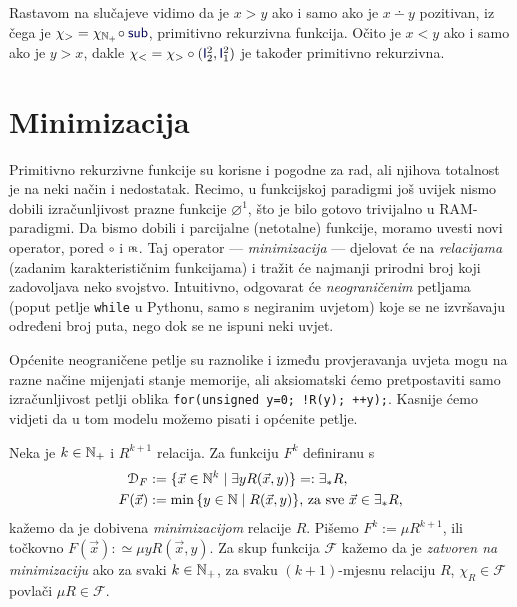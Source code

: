 \begin{primjer}[{name=[primitivna rekurzivnost relacija strogog uređaja]}]\label{pr:m-v}
Rastavom na slučajeve vidimo da je $x>y$ ako i samo ako je $x\dotminus y$ pozitivan, iz čega je $\chi_>=\chi_{\N_+}\!\circ\f{sub}$, pri\-mi\-tiv\-no rekurzivna funkcija. Očito je $x<y$ ako i samo ako je $y>x$, dakle $\chi_<=\chi_>\circ(\f I_2^2,\f I_1^2)$ je također primitivno rekurzivna.
\end{primjer}

\section{Minimizacija}

Primitivno rekurzivne funkcije su korisne i pogodne za rad, ali njihova totalnost je na neki način i nedostatak. Recimo, u funkcijskoj paradigmi još uvijek nismo dobili izračunljivost prazne funkcije $\varnothing^1$, što je bilo gotovo trivijalno u RAM-paradigmi. Da bismo dobili i parcijalne (netotalne) funkcije, moramo uvesti novi operator, pored $\circ$ i $\pr$. Taj operator --- \emph{minimizacija} --- djelovat će na \emph{relacijama} (zadanim karakterističnim funkcijama) i tražit će najmanji prirodni broj koji zadovoljava neko svojstvo. Intuitivno, odgovarat će \emph{neograničenim} petljama (poput petlje \texttt{while} u Pythonu, samo s negiranim uvjetom) koje se ne izvršavaju određeni broj puta, nego dok se ne ispuni neki uvjet.

Općenite neograničene petlje su raznolike i između provjeravanja uvjeta mogu na razne načine mijenjati stanje memorije, ali aksiomatski ćemo pretpostaviti samo izračunljivost petlji oblika \texttt{for(unsigned y=0; !R(y); ++y);}. Kasnije ćemo vidjeti da u tom modelu možemo pisati i općenite petlje.

\begin{definicija}[{name=[minimizacija]}]
Neka je $k\in{\mathbb N}_+$ i $R^{k+1}$ relacija. Za funkciju $F^k$ definiranu s
\begin{align}
    \label{eq:dommu}\mathcal D_{F}&:=\{\vec x\in{\mathbb N}^k\mid\exists yR(\vec x,y)\}=:\exists_*R\text,\\
    F(\vec x)&:=\min\,\{y\in{\mathbb N}\mid R(\vec x,y)\}\text{, za sve $\vec x\in\exists_* R$,}
\end{align}
kažemo da je dobivena \emph{minimizacijom} relacije $R$.
	Pišemo $F^k:=\mu R^{k+1}$, ili točkovno $F(\vec x):\simeq\mu yR(\vec x,y)$.
    Za skup funkcija $\mathcal F$ kažemo da je \emph{zatvoren na minimizaciju} ako za svaki $k\in{\mathbb N}_+$, za svaku $(k+1)$-mjesnu relaciju $R$, $\chi_R\in\mathcal F$ povlači $\mu R\in\mathcal F$. 
\end{definicija}

